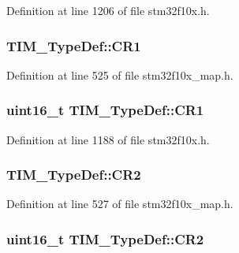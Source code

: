 Definition at line 1206 of file stm32f10x.\+h.

\subsubsection[{\texorpdfstring{C\+R1}{CR1}}]{ T\+I\+M\+\_\+\+Type\+Def\+::\+C\+R1}\hypertarget{struct_t_i_m___type_def_aa6d6b145c88b7fab2f582c4ac7e25f10}{}\label{struct_t_i_m___type_def_aa6d6b145c88b7fab2f582c4ac7e25f10}


Definition at line 525 of file stm32f10x\+\_\+map.\+h.

\subsubsection[{\texorpdfstring{C\+R1}{CR1}}]{ {\bf uint16\+\_\+t} T\+I\+M\+\_\+\+Type\+Def\+::\+C\+R1}\hypertarget{struct_t_i_m___type_def_a410988826004fdd21d55071215144ba9}{}\label{struct_t_i_m___type_def_a410988826004fdd21d55071215144ba9}


Definition at line 1188 of file stm32f10x.\+h.

\subsubsection[{\texorpdfstring{C\+R2}{CR2}}]{ T\+I\+M\+\_\+\+Type\+Def\+::\+C\+R2}\hypertarget{struct_t_i_m___type_def_aaf66ecf9152e78064971d15cbf8e74b8}{}\label{struct_t_i_m___type_def_aaf66ecf9152e78064971d15cbf8e74b8}


Definition at line 527 of file stm32f10x\+\_\+map.\+h.

\subsubsection[{\texorpdfstring{C\+R2}{CR2}}]{ {\bf uint16\+\_\+t} T\+I\+M\+\_\+\+Type\+Def\+::\+C\+R2}\hypertarget{struct_t_i_m___type_def_a954eb69fd4e2e6b43ba6c80986f691d8}{}\label{struct_t_i_m___type_def_a954eb69fd4e2e6b43ba6c80986f691d8}


